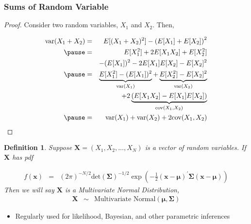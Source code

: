 \documentclass[handout]{beamer}
\newtheorem{defn}{Definition}
\numberwithin{equation}{section}
\begin{document}
\begin{frame}
\frametitle{Sums of Random Variable}

\begin{proof}
Consider two random variables, $X_{1}$ and $X_{2}$.  Then, 

\pause 
\begin{eqnarray}
\text{var}(X_{1} + X_{2} ) & = & E[(X_{1} + X_{2})^2] - \left(E[X_{1}] + E[X_{2}] \right)^2 \nonumber \\  \pause 
& = & E[X_{1}^2]  + 2 E[X_{1}X_{2}]  + E[X_{2}^2]  \nonumber \\
&& - (E[X_{1}])^2 - 2 E[X_{1}] E[X_{2}]  -  E[X_{2}]^2 \nonumber \\ \pause 
& = & \underbrace{E[X_{1}^2] - (E[X_{1}])^2}_{\text{var}(X_{1}) }   + \underbrace{E[X_{2}^2] - E[X_{2}]^{2}}_{\text{var}(X_{2})} \nonumber \\ 
&&  + 2 \underbrace{(E[X_{1} X_{2} ]  - E[X_{1}] E[X_{2} ] )}_{\text{cov}(X_{1}, X_{2} ) }  \nonumber \\ \pause 
& = & \text{var}(X_{1} ) + \text{var}(X_{2} ) + 2 \text{cov}(X_{1}, X_{2}) \nonumber  
\end{eqnarray}

\end{proof}

\end{frame}





\begin{frame}

\begin{defn}
Suppose $\boldsymbol{X} = (X_{1}, X_{2}, \hdots, X_{N}) $ is a vector of random variables.  If $\boldsymbol{X}$ has pdf 

\begin{eqnarray}
f(\boldsymbol{x}) & = & (2 \pi)^{-N/2} \text{det}\left(\boldsymbol{\Sigma}\right)^{-1/2} \exp\left(-\frac{1}{2}(\boldsymbol{x} - \boldsymbol{\mu})^{'}\boldsymbol{\Sigma} (\boldsymbol{x} - \boldsymbol{\mu} ) \right) \nonumber 
\end{eqnarray}
Then we will say $\boldsymbol{X}$ is a \alert{Multivariate Normal} Distribution, 
\begin{eqnarray}
\boldsymbol{X} & \sim & \text{Multivariate Normal} (\boldsymbol{\mu}, \boldsymbol{\Sigma}) \nonumber 
\end{eqnarray}


\end{defn}

\begin{itemize}
\item[-] \alert{Regularly} used for likelihood, Bayesian, and other parametric inferences
\end{itemize}



\end{frame}
\end{document}
